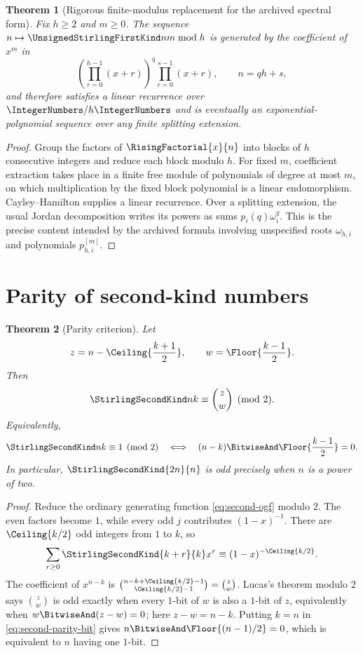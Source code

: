 \documentclass[11pt,a4paper,oneside,openany]{book}
\newtheorem{theorem}{Theorem}[chapter]
\theoremstyle{definition}
\theoremstyle{remark}
\begin{document}
\begin{theorem}[Rigorous finite-modulus replacement for the archived spectral form]
\label{thm:mod-h-structure}
Fix $h\ge2$ and $m\ge0$.  The sequence $n\mapsto\UnsignedStirlingFirstKind nm\bmod h$ is generated by
the coefficient of $x^m$ in
\begin{equation}\label{eq:mod-h-block-product}
 \left(\prod_{r=0}^{h-1}(x+r)\right)^q\prod_{r=0}^{s-1}(x+r),
 \qquad n=qh+s,
\end{equation}
and therefore satisfies a linear recurrence over $\IntegerNumbers/h\IntegerNumbers$ and is eventually an
exponential-polynomial sequence over any finite splitting extension.
\end{theorem}
\begin{proof}
Group the factors of $\RisingFactorial{x}{n}$ into blocks of $h$ consecutive integers and
reduce each block modulo $h$.  For fixed $m$, coefficient extraction takes place in
a finite free module of polynomials of degree at most $m$, on which multiplication by
the fixed block polynomial is a linear endomorphism.  Cayley--Hamilton supplies a
linear recurrence.  Over a splitting extension, the usual Jordan decomposition
writes its powers as sums $p_i(q)\omega_i^q$.  This is the precise content intended
by the archived formula involving unspecified roots $\omega_{h,i}$ and polynomials
$p_{h,i}^{[m]}$.
\end{proof}

\section{Parity of second-kind numbers}
\begin{theorem}[Parity criterion]\label{thm:second-parity}
Let
\[
 z=n-\Ceiling{\frac{k+1}{2}},
 \qquad w=\Floor{\frac{k-1}{2}}.
\]
Then
\begin{equation}\label{eq:second-parity-binomial}
 \StirlingSecondKind nk\equiv\binom zw\pmod2.
\end{equation}
Equivalently,
\begin{equation}\label{eq:second-parity-bit}
 \StirlingSecondKind nk\equiv1\pmod2
 \quad\Longleftrightarrow\quad
 (n-k)\BitwiseAnd\Floor{\frac{k-1}{2}}=0.
\end{equation}
In particular, $\StirlingSecondKind{2n}{n}$ is odd precisely when $n$ is a power of two.
\end{theorem}
\begin{proof}
Reduce the ordinary generating function \cref{eq:second-ogf} modulo $2$.  The even
factors become $1$, while every odd $j$ contributes $(1-x)^{-1}$.  There are
$\Ceiling{k/2}$ odd integers from $1$ to $k$, so
\[
 \sum_{r\ge0}\StirlingSecondKind{k+r}{k}x^r
 \equiv(1-x)^{-\Ceiling{k/2}}.
\]
The coefficient of $x^{n-k}$ is
$\binom{n-k+\Ceiling{k/2}-1}{\Ceiling{k/2}-1}=\binom zw$.
Lucas's theorem modulo $2$ says $\binom zw$ is odd exactly when every $1$-bit of $w$
is also a $1$-bit of $z$, equivalently when $w\BitwiseAnd(z-w)=0$; here $z-w=n-k$.
Putting $k=n$ in \cref{eq:second-parity-bit} gives
$n\BitwiseAnd\Floor{(n-1)/2}=0$, which is equivalent to $n$ having one $1$-bit.
\end{proof}
\end{document}
